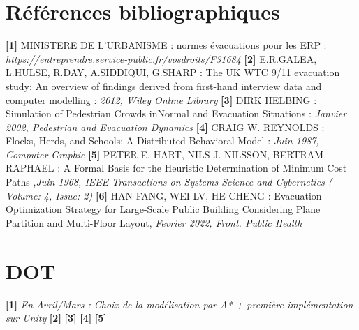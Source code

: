 \documentclass[12pt]{article}
\begin{document}
\section*{Références bibliographiques}
\textbf{[1]} MINISTERE DE L'URBANISME : normes évacuations pour les ERP : \textit{https://entreprendre.service-public.fr/vosdroits/F31684}
\newline\newline
\textbf{[2]} E.R.GALEA, L.HULSE, R.DAY, A.SIDDIQUI, G.SHARP : The UK WTC 9/11 evacuation study: An overview of findings
derived from first-hand interview data and computer modelling : \textit{2012,  Wiley Online Library} 
\newline\newline
\textbf{[3]} DIRK HELBING : Simulation of Pedestrian Crowds inNormal and Evacuation Situations : \textit{Janvier 2002, Pedestrian and Evacuation Dynamics}
\newline\newline
\textbf{[4]} CRAIG W. REYNOLDS : Flocks, Herds, and Schools:
A Distributed Behavioral Model : \textit{Juin 1987, Computer Graphic}
\newline\newline
\textbf{[5]} PETER E. HART, NILS J. NILSSON, BERTRAM RAPHAEL : A Formal Basis for the Heuristic Determination of Minimum Cost Paths
,\textit{Juin 1968, IEEE Transactions on Systems Science and Cybernetics ( Volume: 4, Issue: 2)}
\newline\newline
\textbf{[6]} HAN FANG, WEI LV, HE CHENG : Evacuation Optimization Strategy for Large-Scale Public Building Considering Plane Partition and Multi-Floor Layout,
\textit{Fevrier 2022, Front. Public Health}

\section*{DOT}
\textbf{[1]} \textit{En Avril/Mars : Choix de la modélisation par A* + première implémentation sur Unity}
\newline\newline
\textbf{[2]}
\newline\newline
\textbf{[3]}
\newline\newline
\textbf{[4]}
\newline\newline
\textbf{[5]}
\newline\newline
\end{document}
